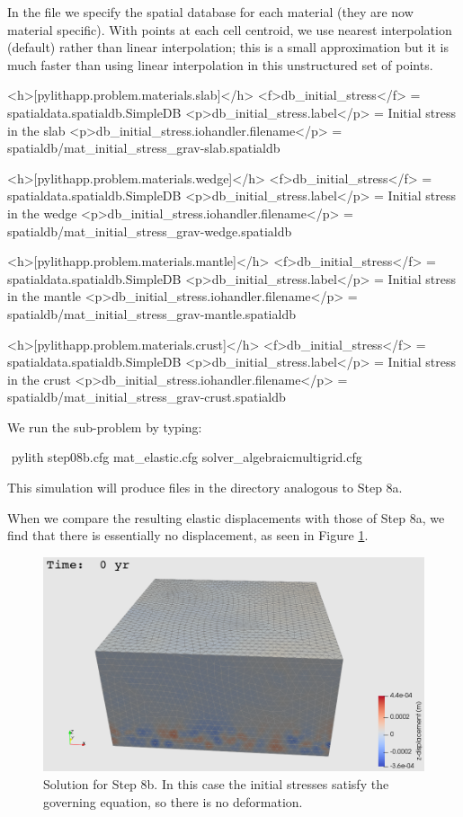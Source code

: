 In the  file we specify the 
spatial database for each material (they are now material
specific). With points at each cell centroid, we use nearest
interpolation (default) rather than linear interpolation; this is a
small approximation but it is much faster than using linear
interpolation in this unstructured set of points.
\begin{cfg}
<h>[pylithapp.problem.materials.slab]</h>
<f>db_initial_stress</f> = spatialdata.spatialdb.SimpleDB
<p>db_initial_stress.label</p> = Initial stress in the slab
<p>db_initial_stress.iohandler.filename</p> = spatialdb/mat_initial_stress_grav-slab.spatialdb

<h>[pylithapp.problem.materials.wedge]</h>
<f>db_initial_stress</f> = spatialdata.spatialdb.SimpleDB
<p>db_initial_stress.label</p> = Initial stress in the wedge
<p>db_initial_stress.iohandler.filename</p> = spatialdb/mat_initial_stress_grav-wedge.spatialdb

<h>[pylithapp.problem.materials.mantle]</h>
<f>db_initial_stress</f> = spatialdata.spatialdb.SimpleDB
<p>db_initial_stress.label</p> = Initial stress in the mantle
<p>db_initial_stress.iohandler.filename</p> = spatialdb/mat_initial_stress_grav-mantle.spatialdb

<h>[pylithapp.problem.materials.crust]</h>
<f>db_initial_stress</f> = spatialdata.spatialdb.SimpleDB
<p>db_initial_stress.label</p> = Initial stress in the crust
<p>db_initial_stress.iohandler.filename</p> =
spatialdb/mat_initial_stress_grav-crust.spatialdb
\end{cfg}

We run the sub-problem by typing:
\begin{shell}
$$ pylith step08b.cfg mat_elastic.cfg solver_algebraicmultigrid.cfg
\end{shell}
This simulation will produce files in the  directory
analogous to Step 8a.

When we compare the resulting elastic displacements with those of
Step 8a, we find that there is essentially no displacement,
as seen in Figure \ref{fig:example:subduction:3d:step08b}.

\begin{figure}
  \includegraphics[width=4.5in]{examples/figs/subduction3d_step08b_soln}
  \caption{Solution for Step 8b. In this case the initial stresses
    satisfy the governing equation, so there is no deformation.}
  \label{fig:example:subduction:3d:step08b}
\end{figure}

